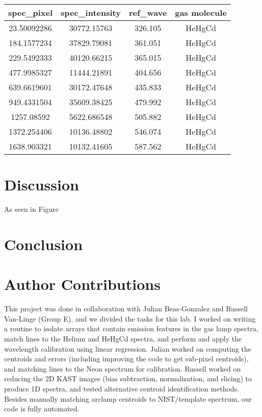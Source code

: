 \documentclass[preprint]{aastex62}
\begin{document}
\begin{table}[H]
    \begin{center}
    \begin{tabular}{|c|c|c|c|}
    \hline
    spec\_pixel & spec\_intensity & ref\_wave & gas molecule \\
    \hline \hline
    23.50092286 & 30772.15763     & 326.105   & HeHgCd  \\
    184.1577234 & 37829.79081     & 361.051   & HeHgCd  \\
    229.5492333 & 40120.66215     & 365.015   & HeHgCd  \\
    477.9985327 & 11444.21891     & 404.656   & HeHgCd  \\
    639.6619601 & 30172.47648     & 435.833   & HeHgCd  \\
    949.4331504 & 35609.38425     & 479.992   & HeHgCd  \\
    1257.08592  & 5622.686548     & 505.882   & HeHgCd  \\
    1372.254406 & 10136.48802     & 546.074   & HeHgCd  \\
    1638.903321 & 10132.41605     & 587.562   & HeHgCd  \\
    \hline
    \end{tabular}
    \end{center}
\end{table}



\section{Discussion} \label{sec:discussion}
As seen in Figure

\section{Conclusion}


\section{Author Contributions}
This project was done in collaboration with Julian Beas-Gonzalez and Russell Van-Linge (Group
E), and we divided the tasks for this lab. I worked on writing a routine to isolate arrays that contain emission features in the gas lamp spectra, match lines to the Helium and HeHgCd spectra, and perform and apply the wavelength calibration using linear regression. Julian worked on computing the centroids and errors (including improving the code to get sub-pixel centroids), and matching lines to the Neon spectrum for calibration. Russell worked on reducing the 2D KAST images (bias subtraction, normalization, and slicing) to produce 1D spectra, and tested alternative centroid identification methods. Besides manually matching arclamp centroids to NIST/template spectrum, our code is fully automated.
\end{document}
